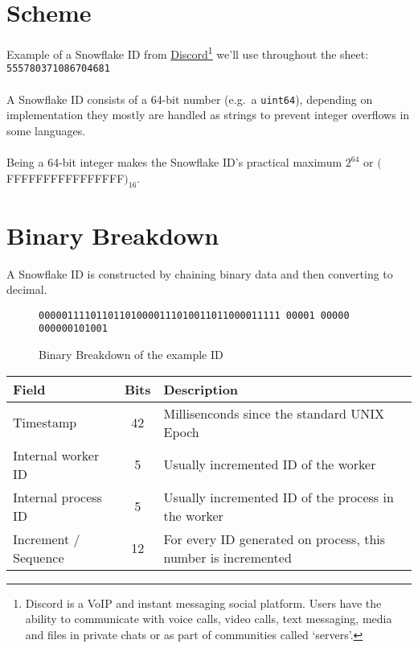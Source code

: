 \documentclass{article}
\newcommand{\code}[1]{\colorbox{cverbbg}{\texttt{#1}}}
\newcommand{\hn}[0]{\hfill \\}
\begin{document}
\section{Scheme}
Example of a Snowflake ID from
\href{https://discord.com/}{Discord}\footnote{Discord is a VoIP and instant
    messaging social platform. Users have the ability to communicate with voice
    calls, video calls, text messaging, media and files in private chats or as
    part
    of communities called `servers'.} we'll use throughout the sheet:
\code{555780371086704681} \\
\hn{}
A Snowflake ID consists of a 64-bit number (e.g.\ a \code{uint64}), depending
on
implementation they mostly are handled as strings to prevent integer overflows
in some languages. \\
\hn{}
Being a 64-bit integer makes the Snowflake ID's practical maximum
$2^{64}$ or $($FFFFFFFFFFFFFFFF$)_{16}$.

\section{Binary Breakdown}
A Snowflake ID is constructed by chaining binary data and then converting to
decimal. \\

\begin{figure}[H]
    \large{\texttt{\color{cyan}000001111011011010000111010011011000011111
            \color{red}00001 \color{green}00000 \color{gray}000000101001}}
    \\
    \caption{Binary Breakdown of the example ID}\label{fig:breakdown_example}
\end{figure}

\begin{table}[h]
    \begin{tabular}{l|c|l}
        Field                & Bits           & Description
        \\ \hline
        Timestamp            & \color{cyan}42 & Millisenconds since the
        standard UNIX Epoch
        \\ \hline
        Internal worker ID   & \color{red}5   & Usually incremented ID of the
        worker
        \\ \hline
        Internal process ID  & \color{green}5 & Usually incremented ID of the
        process in
        the worker
        \\ \hline
        Increment / Sequence & \color{gray}12 & For every ID generated on
        process, this number is incremented
    \end{tabular}
\end{table}
\end{document}
